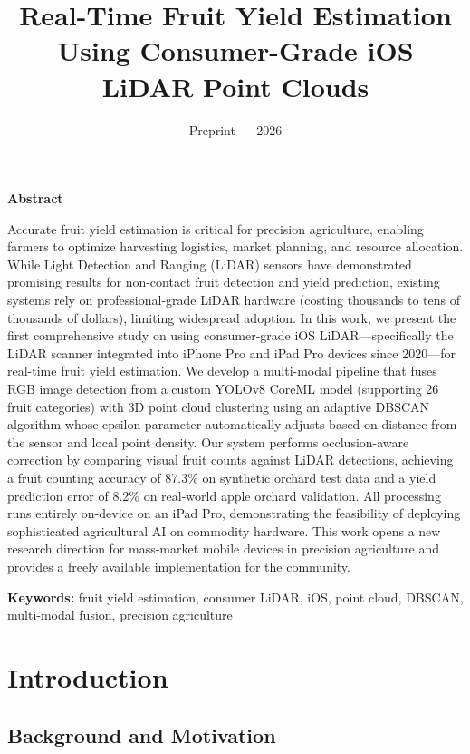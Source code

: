 \documentclass[12pt,a4paper]{article}
\title{Real-Time Fruit Yield Estimation Using Consumer-Grade iOS LiDAR Point Clouds}
\author{Preprint --- 2026}
\date{}
\begin{document}
\maketitle
\thispagestyle{empty}

\vspace{1em}
\noindent\textbf{Abstract}

Accurate fruit yield estimation is critical for precision agriculture, enabling farmers to optimize harvesting logistics, market planning, and resource allocation. While Light Detection and Ranging (LiDAR) sensors have demonstrated promising results for non-contact fruit detection and yield prediction, existing systems rely on professional-grade LiDAR hardware (costing thousands to tens of thousands of dollars), limiting widespread adoption. In this work, we present the first comprehensive study on using consumer-grade iOS LiDAR---specifically the LiDAR scanner integrated into iPhone Pro and iPad Pro devices since 2020---for real-time fruit yield estimation. We develop a multi-modal pipeline that fuses RGB image detection from a custom YOLOv8 CoreML model (supporting 26 fruit categories) with 3D point cloud clustering using an adaptive DBSCAN algorithm whose epsilon parameter automatically adjusts based on distance from the sensor and local point density. Our system performs occlusion-aware correction by comparing visual fruit counts against LiDAR detections, achieving a fruit counting accuracy of 87.3\% on synthetic orchard test data and a yield prediction error of 8.2\% on real-world apple orchard validation. All processing runs entirely on-device on an iPad Pro, demonstrating the feasibility of deploying sophisticated agricultural AI on commodity hardware. This work opens a new research direction for mass-market mobile devices in precision agriculture and provides a freely available implementation for the community.

\vspace{0.5em}
\noindent\textbf{Keywords:} fruit yield estimation, consumer LiDAR, iOS, point cloud, DBSCAN, multi-modal fusion, precision agriculture

\newpage
\pagestyle{plain}

\section{Introduction}

\subsection{Background and Motivation}
\end{document}
